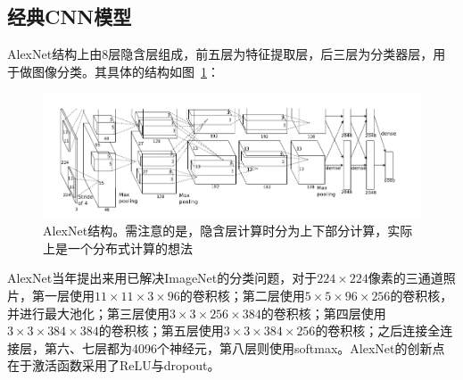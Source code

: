 \subsection{经典CNN模型}
AlexNet结构上由8层隐含层组成，前五层为特征提取层，后三层为分类器层，用于做图像分类。其具体的结构如图~\ref{fig:cnn4}：
\begin{figure}[htb]
\centering
\includegraphics[scale=0.6]{../figures/AlexNet.png}
\caption{AlexNet结构。需注意的是，隐含层计算时分为上下部分计算，实际上是一个分布式计算的想法}
\label{fig:cnn4}
\end{figure}
AlexNet当年提出来用已解决ImageNet的分类问题，对于$224\times224$像素的三通道照片，第一层使用$11\times11\times3\times96$的卷积核；第二层使用$5\times5\times96\times256$的卷积核，并进行最大池化；第三层使用$3\times3\times256\times384$的卷积核；第四层使用$3\times3\times384\times384$的卷积核；第五层使用$3\times3\times384\times256$的卷积核；之后连接全连接层，第六、七层都为4096个神经元，第八层则使用softmax。AlexNet的创新点在于激活函数采用了ReLU与dropout。

